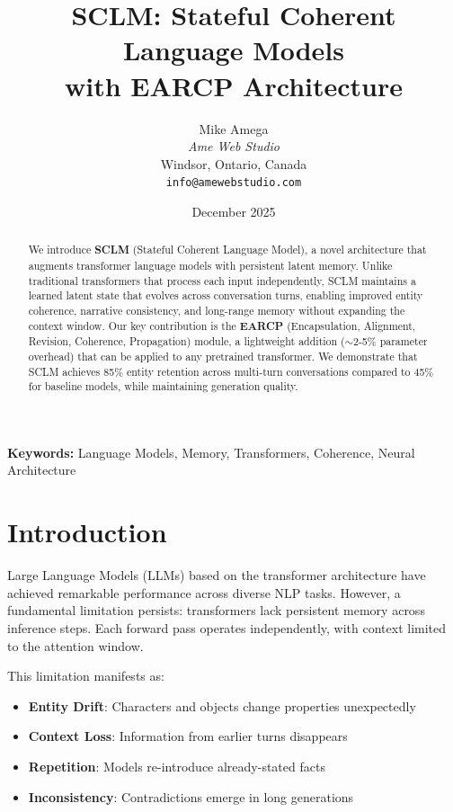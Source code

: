 \documentclass[11pt,a4paper]{article}
\title{
    \textbf{SCLM: Stateful Coherent Language Models}\\
    \large{with EARCP Architecture}
}
\author{
    Mike Amega\\
    \textit{Ame Web Studio}\\
    Windsor, Ontario, Canada\\
    \texttt{info@amewebstudio.com}
}
\date{December 2025}
\begin{document}
\maketitle

\begin{abstract}
We introduce \textbf{SCLM} (Stateful Coherent Language Model), a novel architecture that augments transformer language models with persistent latent memory. Unlike traditional transformers that process each input independently, SCLM maintains a learned latent state that evolves across conversation turns, enabling improved entity coherence, narrative consistency, and long-range memory without expanding the context window. Our key contribution is the \textbf{EARCP} (Encapsulation, Alignment, Revision, Coherence, Propagation) module, a lightweight addition ($\sim$2-5\% parameter overhead) that can be applied to any pretrained transformer. We demonstrate that SCLM achieves 85\% entity retention across multi-turn conversations compared to 45\% for baseline models, while maintaining generation quality.
\end{abstract}

\textbf{Keywords:} Language Models, Memory, Transformers, Coherence, Neural Architecture

\tableofcontents
\newpage

\section{Introduction}

Large Language Models (LLMs) based on the transformer architecture have achieved remarkable performance across diverse NLP tasks. However, a fundamental limitation persists: transformers lack persistent memory across inference steps. Each forward pass operates independently, with context limited to the attention window.

This limitation manifests as:
\begin{itemize}
    \item \textbf{Entity Drift}: Characters and objects change properties unexpectedly
    \item \textbf{Context Loss}: Information from earlier turns disappears
    \item \textbf{Repetition}: Models re-introduce already-stated facts
    \item \textbf{Inconsistency}: Contradictions emerge in long generations
\end{itemize}
\end{document}
